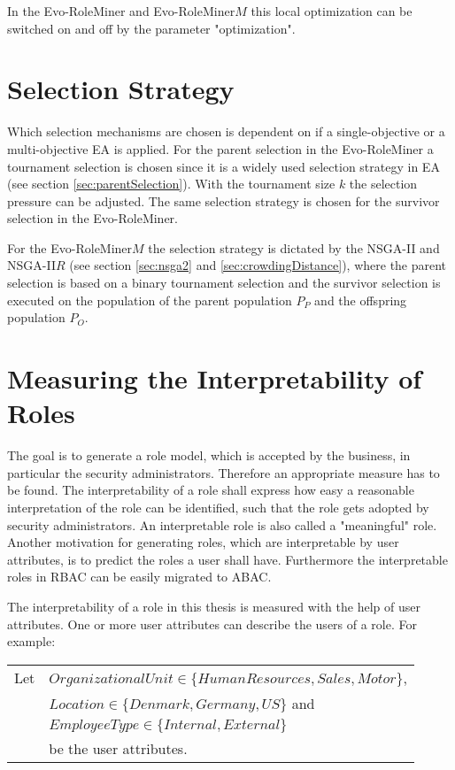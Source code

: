         In the Evo-RoleMiner and Evo-RoleMiner$M$ this local optimization can be switched on and off by the parameter "optimization".
        
    \section{Selection Strategy}
    Which selection mechanisms are chosen is dependent on if a single-objective or a multi-objective EA is applied. 
    For the parent selection in the Evo-RoleMiner a tournament selection is chosen since it is a widely used selection strategy in EA (see section \ref{sec:parentSelection}). With the tournament size $k$ the selection pressure can be adjusted. The same selection strategy is chosen for the survivor selection in the Evo-RoleMiner.
    
    For the Evo-RoleMiner$M$ the selection strategy is dictated by the NSGA-II and NSGA-II$R$ (see section \ref{sec:nsga2} and \ref{sec:crowdingDistance}), where the parent selection is based on a binary tournament selection and the survivor selection is executed on the population of the parent population $P_P$ and the offspring population $P_O$.
    
    \section{Measuring the Interpretability of Roles}
    \label{sec:meaningfulness}
    The goal is to generate a role model, which is accepted by the business, in particular the security administrators. Therefore an appropriate measure has to be found. The interpretability of a role shall express how easy a reasonable interpretation of the role can be identified, such that the role gets adopted by security administrators. An interpretable role is also called a "meaningful" role. Another motivation for generating roles, which are interpretable by user attributes, is to predict the roles a user shall have. Furthermore the interpretable roles in RBAC can be easily migrated to ABAC.
    
    The interpretability of a role in this thesis is measured with the help of user attributes. One or more user attributes can describe the users of a role. For example:
    
    \begin{listliketab}
        \begin{tabular}{ll}
            Let     &  $OrganizationalUnit \in \{HumanResources, Sales, Motor\}$,\\
                    &  $Location \in \{Denmark, Germany, US\}$ and\\
                    &  $EmployeeType \in \{Internal, External\}$\\
                    &  be the user attributes.  
        \end{tabular}
    \end{listliketab}
    
